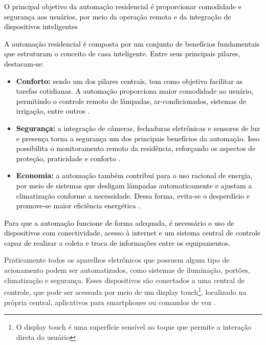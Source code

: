     \textcolor{black}{O principal objetivo da automação residencial é proporcionar comodidade e segurança aos usuários, por meio da operação remota e da integração de dispositivos inteligentes \cite{automacaoTecnologiaPraticidade}}

    \textcolor{black}{A automação residencial é composta por um conjunto de benefícios fundamentais que estruturam o conceito de casa inteligente. Entre seus principais pilares, destacam-se:}

    \begin{itemize}
        \item \textbf{\textcolor{black}{Conforto:}} \textcolor{black}{sendo um dos pilares centrais, tem como objetivo facilitar as tarefas cotidianas. A automação proporciona maior comodidade ao usuário, permitindo o controle remoto de lâmpadas, ar-condicionados, sistemas de irrigação, entre outros \cite{automacaoTecnologiaPraticidade}.}
        
        \item \textbf{\textcolor{black}{Segurança:}} \textcolor{black}{a integração de câmeras, fechaduras eletrônicas e sensores de luz e presença torna a segurança um dos principais benefícios da automação. Isso possibilita o monitoramento remoto da residência, reforçando os aspectos de proteção, praticidade e conforto \cite{automacaoTecnologiaPraticidade}.}
        
        \item \textbf{\textcolor{black}{Economia:}} \textcolor{black}{a automação também contribui para o uso racional de energia, por meio de sistemas que desligam lâmpadas automaticamente e ajustam a climatização conforme a necessidade. Dessa forma, evita-se o desperdício e promove-se maior eficiência energética \cite{automacaoTecnologiaPraticidade}.}
        
    \end{itemize}

    \textcolor{black}{Para que a automação funcione de forma adequada, é necessário o uso de dispositivos com conectividade, acesso à internet e um sistema central de controle capaz de realizar a coleta e troca de informações entre os equipamentos.}

    Praticamente todos os aparelhos eletrônicos que possuem algum tipo de acionamento podem ser automatizados, como sistemas de iluminação, portões, climatização e segurança. Esses dispositivos são conectados a uma central de controle, que pode ser acessada por meio de um display touch\footnote{O display touch é uma superfície sensível ao toque que permite a interação direta do usuário}, localizado na própria central, aplicativos para smartphones ou comandos de voz \cite{automacaoTecnologiaPraticidade}.

